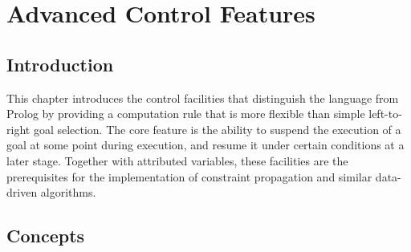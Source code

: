 %
%
%
%
%
%
%

\chapter{Advanced Control Features}
\label{suspensions}

\section{Introduction}
This chapter introduces the control facilities that distinguish the
{\eclipse} language from Prolog by providing a computation
rule that is more flexible than simple left-to-right goal selection.
The core feature is the ability to suspend the execution of a goal
at some point during execution, and resume it under certain conditions
at a later stage.
Together with attributed variables, these facilities are the
prerequisites for the implementation of constraint propagation
and similar data-driven algorithms.

%

\section{Concepts}
